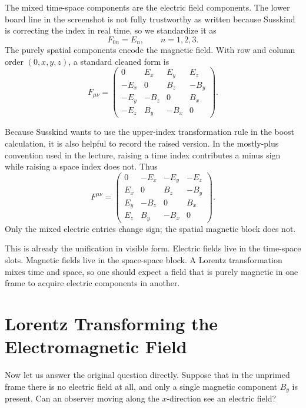 The mixed time-space components are the electric field components. The lower board line in the screenshot is not fully trustworthy as written because Susskind is correcting the index in real time, so we standardize it as
\begin{equation}
F_{0n}=E_n,\qquad n=1,2,3.
\end{equation}
The purely spatial components encode the magnetic field. With row and column order $(0,x,y,z)$, a standard cleaned form is
\begin{equation}
F_{\mu\nu}=
\begin{pmatrix}
0&E_x&E_y&E_z\\
-E_x&0&B_z&-B_y\\
-E_y&-B_z&0&B_x\\
-E_z&B_y&-B_x&0
\end{pmatrix}.
\end{equation}

Because Susskind wants to use the upper-index transformation rule in the boost calculation, it is also helpful to record the raised version. In the mostly-plus convention used in the lecture, raising a time index contributes a minus sign while raising a space index does not. Thus
\begin{equation}
F^{\mu\nu}=
\begin{pmatrix}
0&-E_x&-E_y&-E_z\\
E_x&0&B_z&-B_y\\
E_y&-B_z&0&B_x\\
E_z&B_y&-B_x&0
\end{pmatrix}.
\end{equation}
Only the mixed electric entries change sign; the spatial magnetic block does not.

This is already the unification in visible form. Electric fields live in the time-space slots. Magnetic fields live in the space-space block. A Lorentz transformation mixes time and space, so one should expect a field that is purely magnetic in one frame to acquire electric components in another.

\section{Lorentz Transforming the Electromagnetic Field}

Now let us answer the original question directly. Suppose that in the unprimed frame there is no electric field at all, and only a single magnetic component $B_y$ is present. Can an observer moving along the $x$-direction see an electric field?

